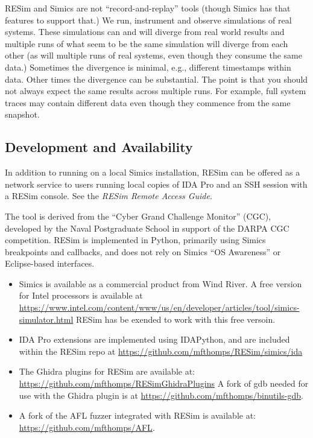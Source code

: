 \documentclass[titlepage]{article}
\begin{document}
RESim and Simics are not ``record-and-replay'' tools (though Simics has that features to support that.)  We run, instrument and observe simulations of real systems.
These simulations can and will diverge from real world results and multiple runs of what seem to be the same simulation will diverge from each other (as will
multiple runs of real systems, even though they consume the same data.)  Sometimes the divergence is minimal, e.g., different timestamps within data.  Other times
the divergence can be substantial.  The point is that you should not always expect the same results across multiple runs.  For example, full system traces
may contain different data even though they commence from the same snapshot.  

\subsection{Development and Availability}
In addition to running on a local Simics installation, RESim can be offered as a network service to users running local copies of IDA Pro and an SSH session with a RESim console.  See the \textit{RESim Remote Access Guide}.  


The tool is derived from the “Cyber Grand Challenge Monitor” (CGC), developed by the Naval Postgraduate School in support of the DARPA CGC competition.  
RESim is implemented in Python, primarily using Simics breakpoints and callbacks, and does not rely on 
Simics “OS Awareness” or Eclipse-based interfaces.   
\begin{itemize}
\item Simics is available as a commercial product from Wind River.  A free version for Intel processors is available at
\url{https://www.intel.com/content/www/us/en/developer/articles/tool/simics-simulator.html}  RESim has be exended to work with this
free versoin.

\item IDA Pro extensions are implemented using IDAPython, and are included within the RESim repo at
\url{https://github.com/mfthomps/RESim/simics/ida}  

\item The Ghidra plugins for RESim are available at: \url{https://github.com/mfthomps/RESimGhidraPlugins}  A fork 
of gdb needed for use with the Ghidra plugin is at \url{https://github.com/mfthomps/binutils-gdb}.

\item A fork of the AFL fuzzer integrated with 
RESim is available at: \url{https://github.com/mfthomps/AFL}.
\end{itemize}
\end{document}
